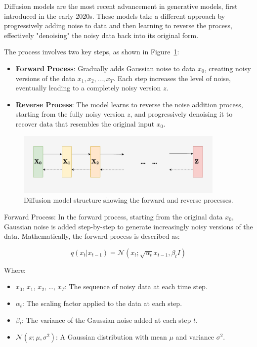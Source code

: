 Diffusion models are the most recent advancement in generative models, first introduced in the early 2020s. These models take a different approach by progressively adding noise to data and then learning to reverse the process, effectively "denoising" the noisy data back into its original form.

The process involves two key steps, as shown in Figure~\ref{fig:Diffusion_structure}:
\begin{itemize}
  \item \textbf{Forward Process}: Gradually adds Gaussian noise to data \(x_0\), creating noisy versions of the data \(x_1, x_2, \dots, x_T\). Each step increases the level of noise, eventually leading to a completely noisy version \(z\).
  \item \textbf{Reverse Process}: The model learns to reverse the noise addition process, starting from the fully noisy version \(z\), and progressively denoising it to recover data that resembles the original input \(x_0\).
\end{itemize}

\begin{figure}[h]
    \centering
    \includegraphics[width=0.9\textwidth]{./Images/Disffusion_structure.jpg}
    \caption{Diffusion model structure showing the forward and reverse processes.}
    \label{fig:Diffusion_structure}
\end{figure}

Forward Process:
In the forward process, starting from the original data \(x_0\), Gaussian noise is added step-by-step to generate increasingly noisy versions of the data. Mathematically, the forward process is described as:

\begin{equation}
q(x_t | x_{t-1}) = \mathcal{N}(x_t; \sqrt{\alpha_t} x_{t-1}, \beta_t I)
\end{equation}

Where:
\begin{itemize}
    \item \(x_0\), \(x_1\), \(x_2\), \dots, \(x_T\): The sequence of noisy data at each time step.
    \item \(\alpha_t\): The scaling factor applied to the data at each step.
    \item \(\beta_t\): The variance of the Gaussian noise added at each step \(t\).
    \item \(\mathcal{N}(x; \mu, \sigma^2)\): A Gaussian distribution with mean \(\mu\) and variance \(\sigma^2\).
\end{itemize}


